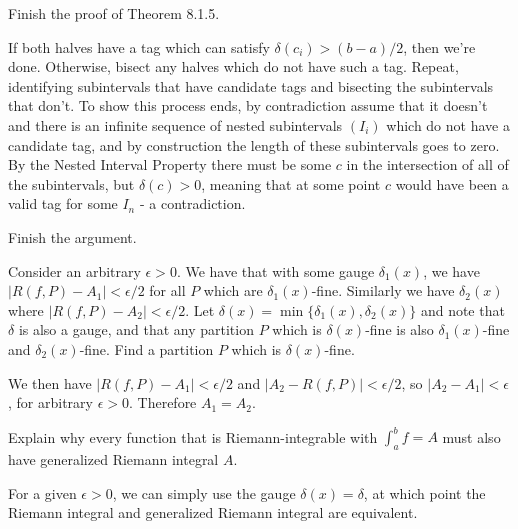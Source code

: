 \begin{exercise}
Finish the proof of Theorem 8.1.5.
\end{exercise}
\begin{solution}
If both halves have a tag which can satisfy \(\delta(c_i) > (b-a)/2\), then we're done. Otherwise, bisect any halves which do not have such a tag. Repeat, identifying subintervals that have candidate tags and bisecting the subintervals that don't. To show this process ends, by contradiction assume that it doesn't and there is an infinite sequence of nested subintervals \((I_i)\) which do not have a candidate tag, and by construction the length of these subintervals goes to zero. By the Nested Interval Property there must be some \(c\) in the intersection of all of the subintervals, but \(\delta(c) > 0\), meaning that at some point \(c\) would have been a valid tag for some \(I_n\) - a contradiction.
\end{solution}

\begin{exercise}
Finish the argument.
\end{exercise}
\begin{solution}
Consider an arbitrary \(\epsilon > 0\). We have that with some gauge \(\delta_1(x)\), we have \(|R(f,P) - A_1| < \epsilon / 2\) for all \(P\) which are \(\delta_1(x)\)-fine. Similarly we have \(\delta_2(x)\) where \(|R(f,P) - A_2| < \epsilon / 2\). Let \(\delta(x) = \min\{\delta_1(x), \delta_2(x)\}\) and note that \(\delta\) is also a gauge, and that any partition \(P\) which is \(\delta(x)\)-fine is also \(\delta_1(x)\)-fine and \(\delta_2(x)\)-fine. Find a partition \(P\) which is \(\delta(x)\)-fine.

We then have \(|R(f,P) - A_1| < \epsilon/2\) and \(|A_2 - R(f,P)| < \epsilon/2\), so \(|A_2 - A_1| < \epsilon\), for arbitrary \(\epsilon > 0\). Therefore \(A_1 = A_2\).
\end{solution}

\begin{exercise}
Explain why every function that is Riemann-integrable with \(\int^b_a f = A\) must also have generalized Riemann integral \(A\).
\end{exercise}
\begin{solution}
For a given \(\epsilon > 0\), we can simply use the gauge \(\delta(x) = \delta\), at which point the Riemann integral and generalized Riemann integral are equivalent.
\end{solution}

